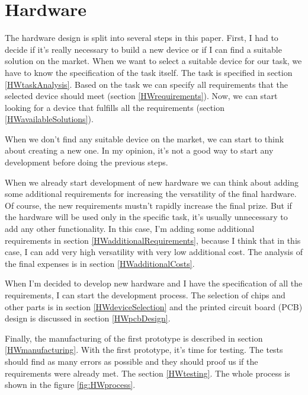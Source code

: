 \chapter{Hardware}
The hardware design is split into several steps in this paper. First, I had to decide if it's really necessary to build a new device or if I can find a suitable solution on the market. When we want to select a suitable device for our task, we have to know the specification of the task itself. The task is specified in section \ref{HWtaskAnalysis}. Based on the task we can specify all requirements that the selected device should meet (section \ref{HWrequirements}). Now, we can start looking for a device that fulfills all the requirements (section \ref{HWavailableSolutions}).

When we don't find any suitable device on the market, we can start to think about creating a new one. In my opinion, it's not a good way to start any development before doing the previous steps.

When we already start development of new hardware we can think about adding some additional requirements for increasing the versatility of the final hardware. Of course, the new requirements mustn't rapidly increase the final prize. But if the hardware will be used only in the specific task, it's usually unnecessary to add any other functionality. In this case, I'm adding some additional requirements in section \ref{HWadditionalRequirements}, because I think that in this case, I can add very high versatility with very low additional cost. The analysis of the final expenses is in section \ref{HWadditionalCosts}.

When I'm decided to develop new hardware and I have the specification of all the requirements, I can start the development process. The selection of chips and other parts is in section \ref{HWdeviceSelection} and the printed circuit board (\ac{PCB}) design is discussed in section \ref{HWpcbDesign}.

Finally, the manufacturing of the first prototype is described in section \ref{HWmanufacturing}. With the first prototype, it's time for testing. The tests should find as many errors as possible and they should proof us if the requirements were already met. The section \ref{HWtesting}. The whole process is shown in the figure \ref{fig:HWprocess}.

